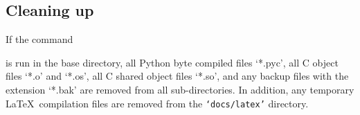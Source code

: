 \subsection{Cleaning up}

If the command


is run in the base directory, all Python byte compiled files `*.pyc', all C object files `*.o' and `*.os', all C shared object files `*.so', and any backup files with the extension `*.bak' are removed from all sub-directories.  In addition, any temporary \LaTeX\ compilation files are removed from the \texttt{`docs/latex'} directory.
